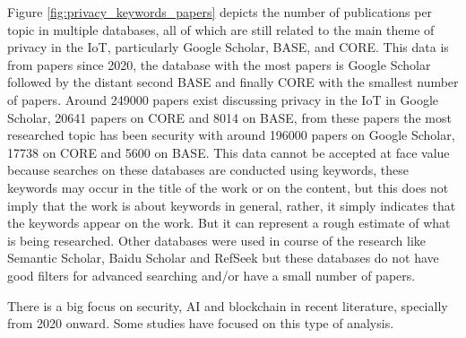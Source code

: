 Figure \ref{fig:privacy_keywords_papers} depicts the number of publications
per topic in multiple databases, all of which are still related to the main
theme of privacy in the IoT, particularly Google Scholar, BASE, and CORE. This
data is from papers since 2020, the database with the most papers is Google Scholar
followed by the distant second BASE and finally
CORE with the smallest number of papers. Around 249000 papers exist discussing privacy
in the IoT in Google Scholar, 20641 papers on CORE and 8014 on BASE, from these papers
the most researched topic has been security with around 196000 papers on Google Scholar,
17738 on CORE and 5600 on BASE. This data cannot be accepted at face value because
searches on these databases are conducted using keywords, these keywords may occur
in the title of the work or on the content, but this does not imply that the work
is about keywords in general, rather, it simply indicates that the keywords appear
on the work. But it can represent a rough estimate of what is being researched.
Other databases were used in course of the research like Semantic Scholar,
Baidu Scholar and RefSeek but these databases do not have good
filters for advanced searching and/or have a small number of papers.

There is a big focus on security, AI and blockchain in recent literature,
specially from 2020 onward. Some studies \cite{dadkhah2020publications, duygu2023analysis} have
focused on this type of analysis.

